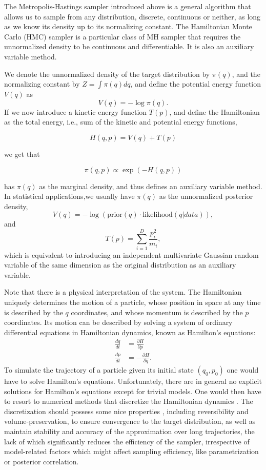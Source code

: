 \documentclass[12pt]{report}
\begin{document}
The Metropolis-Hastings sampler introduced above is a general algorithm that allows us to sample from any distribution, discrete, continuous or neither, as long as we know its density up to its normalizing constant. The Hamiltonian Monte Carlo (HMC) sampler is a particular class of MH sampler that requires the unnormalized density to be continuous and differentiable. It is also an auxiliary variable method. 


We denote the unnormalized density of the target distribution by $\pi(q)$, and the normalizing constant by $Z = \int\pi(q)dq $, and define the potential energy function $V(q)$ as 
\[ V(q) =  -\log \pi(q) .\]
If we now introduce a kinetic energy function $T(p)$, and define
the Hamiltonian as the total energy, i.e., sum of the kinetic and potential energy functions, 

\[ H(q,p) = V(q) + T(p) \]

we get that 

\[\pi(q,p) \propto  \exp(-H(q,p)) \]

has $\pi(q)$ as the marginal density, and thus defines an auxiliary variable method. In statistical applications,we usually have $\pi(q)$ as the unnormalized posterior
density, 
\[V(q) = -\log(\text{prior}(q) \cdot \text{likelihood}(q|data) ), \]
and 
\[T(p) = \sum_{i=1}^D \frac{p_i^2}{m_i}, \]
which is equivalent to introducing an independent multivariate Gaussian random variable of
the same dimension as the original distribution as an auxiliary variable. 

Note that there is a physical interpretation of the system. The Hamiltonian uniquely determines the motion of a particle, whose position in space at any time is described by the $q$ coordinates, and whose momentum is described by the $p$ coordinates. Its motion can be described by solving a system of ordinary differential equations in Hamiltonian dynamics, known as Hamilton's equations:
\begin{align*}
    \frac{dq}{dt} &= \frac{\partial H}{\partial p } \\
    \frac{dp}{dt} &= -\frac{\partial H}{\partial q}.
\end{align*}
To simulate the trajectory of a particle given its initial state $(q_0,p_0)$ one
would have to solve Hamilton's equations. Unfortunately, there are in general no
explicit solutions for Hamilton's equations except for trivial models. One would
then have to resort to numerical methods that discretize the Hamiltonian
dynamics \cite{leimkuhler2004simulating}. The discretization should
possess some nice properties , including reversibility and volume-preservation, to ensure convergence to the target distribution, as well as  maintain 
stability and accuracy of the approximation over long trajectories, the lack of which significantly reduces the efficiency of the sampler, irrespective of model-related factors which might affect sampling efficiency, like parametrization or posterior correlation.  
\end{document}
